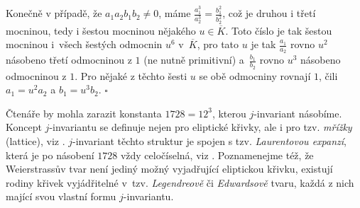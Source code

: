 \documentclass[12pt]{report}
\begin{document}
Konečně v případě, že $a_1 a_2 b_1 b_2 \neq 0$, máme $\frac{a_1^3}{a_2^3} = \frac{b_1^2}{b_2^2}$, což je druhou i třetí mocninou, tedy i šestou mocninou nějakého $u \in \overline{K}$. Toto číslo je tak šestou mocninou i~všech šestých odmocnin $u^6$ v~$\overline{K}$, pro tato $u$ je tak $\frac{a_1}{a_2}$ rovno $u^2$ násobeno třetí odmocninou z $1$ (ne nutně primitivní) a~$\frac{b_1}{b_2}$ rovno $u^3$ násobeno odmocninou z $1$. Pro nějaké z těchto šesti $u$ se obě odmocniny rovnají $1$, čili $a_1 = u^2 a_2$ a $b_1 = u^3 b_2$. \hfill $\square$\\

\begin{poznamka}
Čtenáře by mohla zarazit konstanta $1728 = 12^3$, kterou $j$-invariant násobíme. Koncept $j$-invariantu se definuje nejen pro eliptické křivky, ale i pro tzv. \textit{mřížky} (lattice), viz \cite[Def. 16.2]{Sutherland}. $j$-invariant těchto struktur je spojen s tzv. \textit{Laurentovou expanzí}, která je po násobení $1728$ vždy celočíselná, viz \cite[Ch. 11]{Cox}. Poznamenejme též, že Weierstrassův tvar není jediný možný vyjadřující eliptickou křivku, existují rodiny křivek vyjádřitelné v~tzv. \textit{Legendreově} či \textit{Edwardsově} tvaru, každá z nich mající svou vlastní formu $j$-invariantu. 
\end{poznamka}
\end{document}
